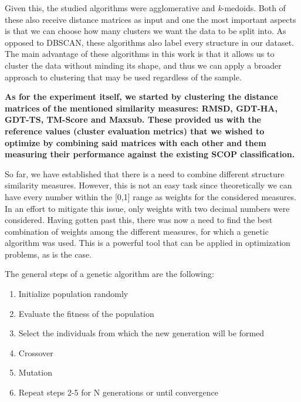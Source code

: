 Given this, the studied algorithms were agglomerative and \textit{k}-medoids. Both of these also receive distance matrices as input and one the most important aspects is that we can choose how many clusters we want the data to be split into. As opposed to DBSCAN, these algorithms also label every structure in our dataset. The main advantage of these algorithms in this work is that it allows us to cluster the data without minding its shape, and thus we can apply a broader approach to clustering that may be used regardless of the sample.

\textbf{As for the experiment itself, we started by clustering the distance matrices of the mentioned similarity measures: RMSD, GDT-HA, GDT-TS, TM-Score and Maxsub. These provided us with the reference values (cluster evaluation metrics) that we wished to optimize by combining said matrices with each other and them measuring their performance against the existing SCOP classification.}

So far, we have established that there is a need to combine different structure similarity measures. However, this is not an easy task since theoretically we can have every number within the [0,1] range as weights for the considered measures. In an effort to mitigate this issue, only weights with two decimal numbers were considered. Having gotten past this, there was now a need to find the best combination of weights among the different measures, for which a genetic algorithm was used. This is a powerful tool that can be applied in optimization problems, as is the case.

The general steps of a genetic algorithm are the following:
\begin{enumerate}
	\item Initialize population randomly
	\item Evaluate the fitness of the population
	\item Select the individuals from which the new generation will be formed
	\item Crossover
	\item Mutation
	\item Repeat steps 2-5 for N generations or until convergence
\end{enumerate}

